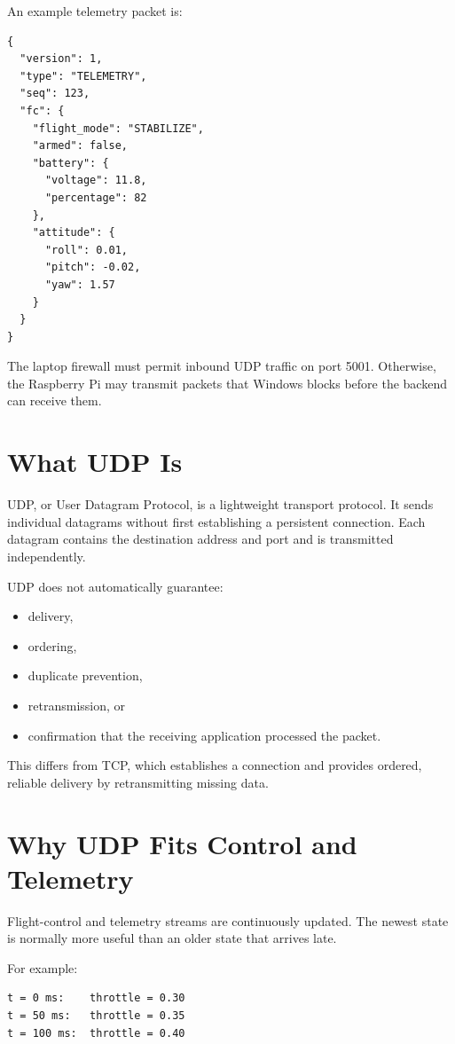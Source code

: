 \documentclass[11pt]{article}
\begin{document}
An example telemetry packet is:

\begin{lstlisting}
{
  "version": 1,
  "type": "TELEMETRY",
  "seq": 123,
  "fc": {
    "flight_mode": "STABILIZE",
    "armed": false,
    "battery": {
      "voltage": 11.8,
      "percentage": 82
    },
    "attitude": {
      "roll": 0.01,
      "pitch": -0.02,
      "yaw": 1.57
    }
  }
}
\end{lstlisting}

The laptop firewall must permit inbound UDP traffic on port 5001. Otherwise,
the Raspberry Pi may transmit packets that Windows blocks before the backend
can receive them.

\section{What UDP Is}

UDP, or User Datagram Protocol, is a lightweight transport protocol. It sends
individual datagrams without first establishing a persistent connection.
Each datagram contains the destination address and port and is transmitted
independently.

UDP does not automatically guarantee:

\begin{itemize}[leftmargin=*]
    \item delivery,
    \item ordering,
    \item duplicate prevention,
    \item retransmission, or
    \item confirmation that the receiving application processed the packet.
\end{itemize}

This differs from TCP, which establishes a connection and provides ordered,
reliable delivery by retransmitting missing data.

\section{Why UDP Fits Control and Telemetry}

Flight-control and telemetry streams are continuously updated. The newest
state is normally more useful than an older state that arrives late.

For example:

\begin{lstlisting}
t = 0 ms:    throttle = 0.30
t = 50 ms:   throttle = 0.35
t = 100 ms:  throttle = 0.40
\end{lstlisting}
\end{document}
